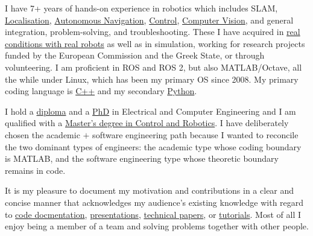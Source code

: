\documentclass[a4paper,10pt,twoside]{article}
\begin{document}
\vspace{-0.5cm}
\begin{bw_box} \small
  \hspace{1em}I have 7+ years of hands-on experience in robotics which includes SLAM, \href{https://github.com/li9i/fsm-lo}{Localisation},
  \href{https://link.springer.com/article/10.1007/s10846-019-01086-y}{Autonomous Navigation}, \href{https://www.tandfonline.com/doi/full/10.1080/00207179.2018.1514129}{Control},
  \href{https://github.com/li9i/pandora\_vision\_2014}{Computer Vision}, and
  general integration, problem-solving, and troubleshooting. These I have acquired in \href{https://relief.web.auth.gr/\%CF\%81\%CE\%BF\%CE\%BC\%CF\%80\%CE\%BF\%CF\%84\%CE\%B9\%CE\%BA\%CE\%AC-\%CE\%BF\%CF\%87\%CE\%AE\%CE\%BC\%CE\%B1\%CF\%84\%CE\%B1/}{real
  conditions with real robots} as well as in simulation, working for research
  projects funded by the European Commission and the Greek State, or through volunteering. I am proficient in ROS and ROS 2, but also MATLAB/Octave, all the while under Linux, which has been my primary OS since 2008. My
  primary coding language is \href{https://github.com/li9i/fsm}{C++} and my
  secondary
  \href{https://github.com/cultureid-auth-ros-packages/cultureid-waypoints-following}{Python}.

  \hspace{1em}I hold a \href{https://ikee.lib.auth.gr/record/291560}{diploma} and a \href{https://ikee.lib.auth.gr/record/354644}{PhD} in Electrical and Computer Engineering and I
  am qualified with a
  \href{http://kth.diva-portal.org/smash/record.jsf?pid=diva2\%3A1102597\&dswid=2875}{Master's degree in Control and Robotics}.
  I have deliberately chosen the academic $+$ software engineering path because I
  wanted to reconcile the two dominant types of engineers: the academic type
  whose coding boundary is MATLAB, and the software engineering type whose
  theoretic boundary remains in code.

  \hspace{1em}It is my pleasure to document my motivation and contributions in a clear and concise
  manner that acknowledges my audience's existing knowledge with regard to
  \href{https://github.com/li9i/pandora_vision_2014/blob/hydro-devel/pandora_vision_hole_detector/src/hole_fusion_node/hole_fusion.cpp}{code docmentation},
  \href{https://www.youtube.com/watch?v=xaDKjI0WkDc}{presentations}, \href{https://ieeexplore.ieee.org/abstract/document/9981228}{technical papers},
  or \href{https://github.com/li9i/ros1_humble_bridge_template}{tutorials}. Most of all I enjoy being a member of a team and solving problems together with other people.
\end{bw_box}
\end{document}
